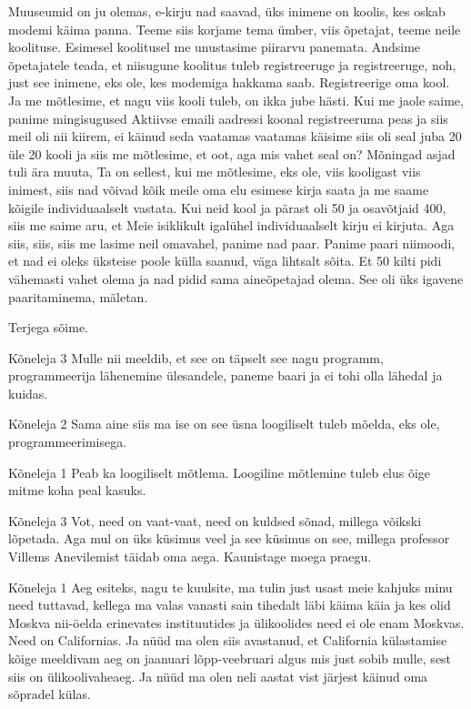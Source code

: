 Muuseumid on ju olemas, e-kirju nad saavad, üks inimene on koolis, kes oskab modemi käima panna. Teeme siis korjame tema ümber, viis õpetajat, teeme neile koolituse. Esimesel koolitusel me unustasime piirarvu panemata. Andsime õpetajatele teada, et niisugune koolitus tuleb registreeruge ja registreeruge, noh, just see inimene, eks ole, kes modemiga hakkama saab. Registreerige oma kool. Ja me mõtlesime, et nagu viis kooli tuleb, on ikka jube hästi. Kui me jaole saime, panime mingisugused Aktiivse emaili aadressi koonal registreeruma peas ja siis meil oli nii kiirem, ei käinud seda vaatamas vaatamas käisime siis oli seal juba 20 üle 20 kooli ja siis me mõtlesime, et oot, aga mis vahet seal on? Mõningad asjad tuli ära muuta, Ta on sellest, kui me mõtlesime, eks ole, viis kooligast viis inimest, siis nad võivad kõik meile oma elu esimese kirja saata ja me saame kõigile individuaalselt vastata. Kui neid kool ja pärast oli 50 ja osavõtjaid 400, siis me saime aru, et Meie isiklikult igalühel individuaalselt kirju ei kirjuta. Aga siis, siis, siis me lasime neil omavahel, panime nad paar. Panime paari niimoodi, et nad ei oleks üksteise poole külla saanud, väga lihtsalt sõita. Et 50 kilti pidi vähemasti vahet olema ja nad pidid sama aineõpetajad olema. See oli üks igavene paaritaminema, mäletan. 

Terjega sõime. 

Kõneleja 3
Mulle nii meeldib, et see on täpselt see nagu programm, programmeerija lähenemine ülesandele, paneme baari ja ei tohi olla lähedal ja kuidas. 

Kõneleja 2
Sama aine siis ma ise on see üsna loogiliselt tuleb mõelda, eks ole, programmeerimisega. 

Kõneleja 1
Peab ka loogiliselt mõtlema. Loogiline mõtlemine tuleb elus õige mitme koha peal kasuks. 

Kõneleja 3
Vot, need on vaat-vaat, need on kuldsed sõnad, millega võikski lõpetada. Aga mul on üks küsimus veel ja see küsimus on see, millega professor Villems Anevilemist täidab oma aega. Kaunistage moega praegu. 

Kõneleja 1
Aeg esiteks, nagu te kuulsite, ma tulin just usast meie kahjuks minu need tuttavad, kellega ma valas vanasti sain tihedalt läbi käima käia ja kes olid Moskva nii-öelda erinevates instituutides ja ülikoolides need ei ole enam Moskvas. Need on Californias. Ja nüüd ma olen siis avastanud, et California külastamise kõige meeldivam aeg on jaanuari lõpp-veebruari algus mis just sobib mulle, sest siis on ülikoolivaheaeg. Ja nüüd ma olen neli aastat vist järjest käinud oma sõpradel külas. 

